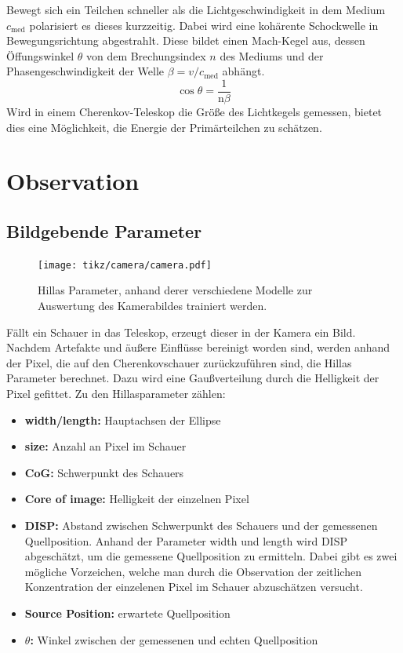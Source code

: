 Bewegt sich ein Teilchen schneller als die Lichtgeschwindigkeit in dem Medium $c_\text{med}$ polarisiert es dieses kurzzeitig. 
Dabei wird eine kohärente Schockwelle in Bewegungsrichtung abgestrahlt. 
Diese bildet einen Mach-Kegel aus, dessen Öffungswinkel $\theta$ von dem Brechungsindex $n$ des Mediums und der Phasengeschwindigkeit der Welle $\beta = v / c_\text{med}$ abhängt.
\begin{equation}
  \cos  \theta = \frac{1}{\text{n} \beta}
\end{equation}
Wird in einem Cherenkov-Teleskop die Größe des Lichtkegels gemessen, bietet dies eine Möglichkeit, die Energie der Primärteilchen zu schätzen. 
\chapter{Observation}
\section{Bildgebende Parameter}
\begin{figure}[H]
  \centering
  \texttt{[image: tikz/camera/camera.pdf]}
  \caption{Hillas Parameter, anhand derer verschiedene Modelle zur Auswertung des Kamerabildes trainiert werden.}
\end{figure}
Fällt ein Schauer in das Teleskop, erzeugt dieser in der Kamera ein Bild. 
Nachdem Artefakte und äußere Einflüsse bereinigt worden sind, werden anhand der Pixel, die auf den Cherenkovschauer zurückzuführen sind, die Hillas Parameter \cite{hillas} berechnet. 
Dazu wird eine Gaußverteilung durch die Helligkeit der Pixel gefittet. 
Zu den Hillasparameter zählen:
\begin{itemize}
  \item \textbf{width/length:} Hauptachsen der Ellipse
  \item \textbf{size:} Anzahl an Pixel im Schauer
  \item \textbf{CoG:} Schwerpunkt des Schauers
  \item \textbf{Core of image:} Helligkeit der einzelnen Pixel
  \item \textbf{DISP:} Abstand zwischen Schwerpunkt des Schauers und der gemessenen Quellposition. Anhand der Parameter width und length wird DISP abgeschätzt, um die gemessene Quellposition zu ermitteln. Dabei gibt es zwei mögliche Vorzeichen, welche man durch die Observation der zeitlichen Konzentration der einzelenen Pixel im Schauer abzuschätzen versucht.
  \item \textbf{Source Position:} erwartete Quellposition
  \item \textbf{$\theta$:} Winkel zwischen der gemessenen und echten Quellposition
\end{itemize}
